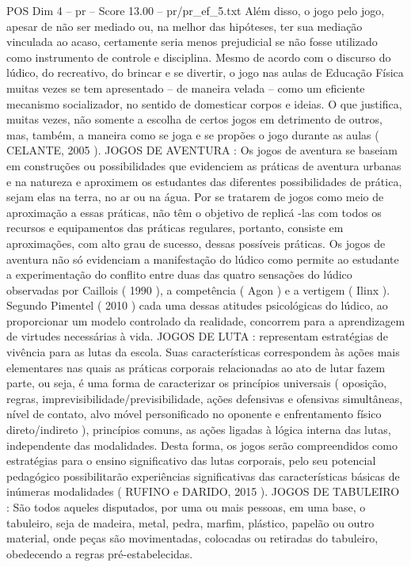 \begin{textsample}{POS Dim 4 – pr – Score 13.00 – pr/pr\_ef\_5.txt}
Além disso, o jogo pelo jogo, apesar de não ser mediado ou, na melhor das hipóteses, ter sua mediação vinculada ao acaso, certamente seria menos prejudicial se não fosse utilizado como instrumento de controle e disciplina.
Mesmo de acordo com o discurso do lúdico, do recreativo, do brincar e se divertir, o jogo nas aulas de Educação Física muitas vezes se tem apresentado – de maneira velada – como um eficiente mecanismo socializador, no sentido de domesticar corpos e ideias.
O que justifica, muitas vezes, não somente a escolha de certos jogos em detrimento de outros, mas, também, a maneira como se joga e se propões o jogo durante as aulas ( CELANTE, 2005 ).
JOGOS DE AVENTURA : Os jogos de aventura se baseiam em construções ou possibilidades que evidenciem as práticas de aventura urbanas e na natureza e aproximem os estudantes das diferentes possibilidades de prática, sejam elas na terra, no ar ou na água.
Por se tratarem de jogos como meio de aproximação a essas práticas, não têm o objetivo de replicá -las com todos os recursos e equipamentos das práticas regulares, portanto, consiste em aproximações, com alto grau de sucesso, dessas possíveis práticas.
Os jogos de aventura não só evidenciam a manifestação do lúdico como permite ao estudante a experimentação do conflito entre duas das quatro sensações do lúdico observadas por Caillois ( 1990 ), a competência ( Agon ) e a vertigem ( Ilinx ).
Segundo Pimentel ( 2010 ) cada uma dessas atitudes psicológicas do lúdico, ao proporcionar um modelo controlado da realidade, concorrem para a aprendizagem de virtudes necessárias à vida.
JOGOS DE LUTA : representam estratégias de vivência para as lutas da escola.
Suas características correspondem às ações mais elementares nas quais as práticas corporais relacionadas ao ato de lutar fazem parte, ou seja, é uma forma de caracterizar os princípios universais ( oposição, regras, imprevisibilidade/previsibilidade, ações defensivas e ofensivas simultâneas, nível de contato, alvo móvel personificado no oponente e enfrentamento físico direto/indireto ), princípios comuns, as ações ligadas à lógica interna das lutas, independente das modalidades.
Desta forma, os jogos serão compreendidos como estratégias para o ensino significativo das lutas corporais, pelo seu potencial pedagógico possibilitarão experiências significativas das características básicas de inúmeras modalidades ( RUFINO e DARIDO, 2015 ).
JOGOS DE TABULEIRO : São todos aqueles disputados, por uma ou mais pessoas, em uma base, o tabuleiro, seja de madeira, metal, pedra, marfim, plástico, papelão ou outro material, onde peças são movimentadas, colocadas ou retiradas do tabuleiro, obedecendo a regras pré-estabelecidas.

\end{textsample}
